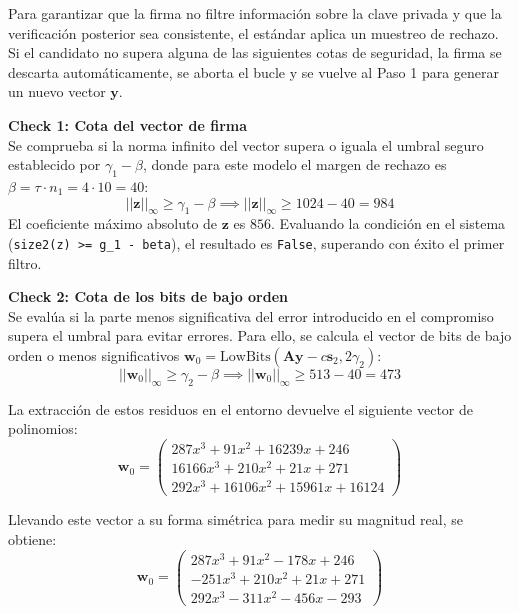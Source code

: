\documentclass[11pt, a4paper]{report}
\theoremstyle{definition}
\begin{document}
Para garantizar que la firma no filtre información sobre la clave privada y que la verificación posterior sea consistente, el estándar aplica un muestreo de rechazo. Si el candidato no supera alguna de las siguientes cotas de seguridad, la firma se descarta automáticamente, se aborta el bucle y se vuelve al Paso 1 para generar un nuevo vector $\mathbf{y}$.

\textbf{Check 1: Cota del vector de firma}\\
Se comprueba si la norma infinito del vector supera o iguala el umbral seguro establecido por $\gamma_1 - \beta$, donde para este modelo el margen de rechazo es $\beta = \tau \cdot n_1 = 4 \cdot 10 = 40$:
\begin{equation}
    ||\mathbf{z}||_\infty \ge \gamma_1 - \beta \implies ||\mathbf{z}||_\infty \ge 1024 - 40 = 984
\end{equation}
El coeficiente máximo absoluto de $\mathbf{z}$ es $856$. Evaluando la condición en el sistema (\texttt{size2(z) >= g\_1 - beta}), el resultado es \texttt{False}, superando con éxito el primer filtro.

\textbf{Check 2: Cota de los bits de bajo orden}\\
Se evalúa si la parte menos significativa del error introducido en el compromiso supera el umbral para evitar errores. Para ello, se calcula el vector de bits de bajo orden o menos significativos $\mathbf{w}_0 = \text{LowBits}(\mathbf{A}\mathbf{y} - c\mathbf{s}_2, 2\gamma_2)$:
\begin{equation}
    ||\mathbf{w}_0||_\infty \ge \gamma_2 - \beta \implies ||\mathbf{w}_0||_\infty \ge 513 - 40 = 473
\end{equation}

La extracción de estos residuos en el entorno devuelve el siguiente vector de polinomios:
\begin{equation}
    \mathbf{w}_0 = \begin{pmatrix}
    287x^3 + 91x^2 + 16239x + 246 \\
    16166x^3 + 210x^2 + 21x + 271 \\
    292x^3 + 16106x^2 + 15961x + 16124
    \end{pmatrix}
\end{equation}

Llevando este vector a su forma simétrica para medir su magnitud real, se obtiene:
\begin{equation}
    \mathbf{w}_0 = \begin{pmatrix}
    287x^3 + 91x^2 - 178x + 246 \\
    -251x^3 + 210x^2 + 21x + 271 \\
    292x^3 - 311x^2 - 456x - 293
    \end{pmatrix}
\end{equation}
\end{document}
